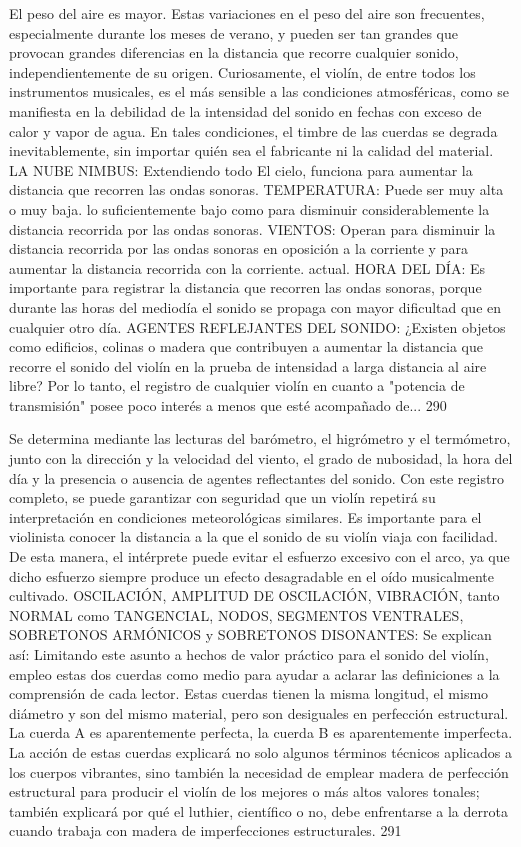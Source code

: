 El peso del aire es mayor. Estas variaciones en el peso del aire son frecuentes, especialmente durante los meses de verano, y pueden ser tan grandes que provocan grandes diferencias en la distancia que recorre cualquier sonido, independientemente de su origen. Curiosamente, el violín, de entre todos los instrumentos musicales, es el más sensible a las condiciones atmosféricas, como se manifiesta en la debilidad de la intensidad del sonido en fechas con exceso de calor y vapor de agua. En tales condiciones, el timbre de las cuerdas se degrada inevitablemente, sin importar quién sea el fabricante ni la calidad del material.
LA NUBE NIMBUS: Extendiendo todo
El cielo, funciona para aumentar la distancia que recorren las ondas sonoras.
TEMPERATURA: Puede ser muy alta o muy baja.
lo suficientemente bajo como para disminuir considerablemente la distancia recorrida por las ondas sonoras.
VIENTOS: Operan para disminuir la distancia recorrida por las ondas sonoras en oposición a la corriente y para aumentar la distancia recorrida con la corriente.
actual.
HORA DEL DÍA: Es importante para registrar la distancia que recorren las ondas sonoras, porque durante las horas del mediodía el sonido se propaga con mayor dificultad que en cualquier otro día.
AGENTES REFLEJANTES DEL SONIDO: ¿Existen objetos como edificios, colinas o madera que contribuyen a aumentar la distancia que recorre el sonido del violín en la prueba de intensidad a larga distancia al aire libre?
Por lo tanto, el registro de cualquier violín en cuanto a "potencia de transmisión" posee poco interés a menos que esté acompañado de...
290

Se determina mediante las lecturas del barómetro, el higrómetro y el termómetro, junto con la dirección y la velocidad del viento, el grado de nubosidad, la hora del día y la presencia o ausencia de agentes reflectantes del sonido. Con este registro completo, se puede garantizar con seguridad que un violín repetirá su interpretación en condiciones meteorológicas similares. Es importante para el violinista conocer la distancia a la que el sonido de su violín viaja con facilidad. De esta manera, el intérprete puede evitar el esfuerzo excesivo con el arco, ya que dicho esfuerzo siempre produce un efecto desagradable en el oído musicalmente cultivado.
OSCILACIÓN, AMPLITUD DE OSCILACIÓN, VIBRACIÓN, tanto NORMAL como TANGENCIAL, NODOS, SEGMENTOS VENTRALES, SOBRETONOS ARMÓNICOS y SOBRETONOS DISONANTES: Se explican así: Limitando este asunto a hechos de valor práctico para el sonido del violín, empleo estas dos cuerdas como medio para ayudar a aclarar las definiciones a la comprensión de cada lector. Estas cuerdas tienen la misma longitud, el mismo diámetro y son del mismo material, pero son desiguales en perfección estructural. La cuerda A es aparentemente perfecta, la cuerda B es aparentemente imperfecta. La acción de estas cuerdas explicará no solo algunos términos técnicos aplicados a los cuerpos vibrantes, sino también la necesidad de emplear madera de perfección estructural para producir el violín de los mejores o más altos valores tonales; también explicará por qué el luthier, científico o no, debe enfrentarse a la derrota cuando trabaja con madera de imperfecciones estructurales. 291

